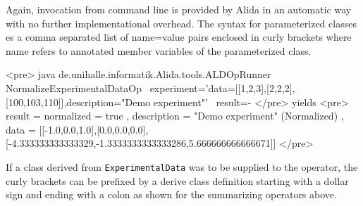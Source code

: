 Again, invocation from command line is provided by Alida in an automatic
way with no further implementational overhead.
The syntax for parameterized classes es a comma separated list of name=value pairs
enclosed in curly brackets where name refers to annotated member variables of
the parameterized class.

<pre>
java de.unihalle.informatik.Alida.tools.ALDOpRunner NormalizeExperimentalDataOp \
	experiment='{data=[[1,2,3],[2,2,2],[100,103,110]],description="Demo experiment"}' \
	result=-
</pre>
yields
<pre>
result = { normalized = true , 
          description = "Demo experiment" (Normalized) , 
          data = [[-1.0,0.0,1.0],[0.0,0.0,0.0],
                  [-4.333333333333329,-1.3333333333333286,5.666666666666671]] }
</pre>

If a class derived from \lstinline+ExperimentalData+ was to be supplied to the operator,
the curly brackets can be prefixed by a derive class definition starting with a dollar sign
and ending with a colon as shown for the summarizing operators above.
